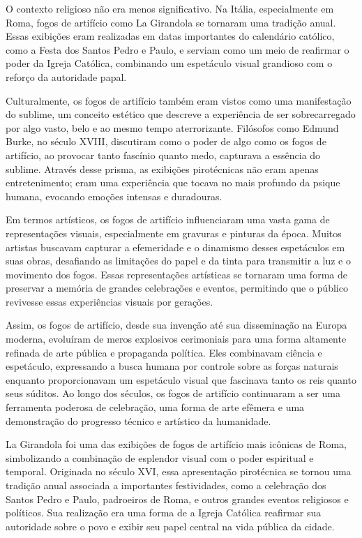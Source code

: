 O contexto religioso não era menos significativo. Na Itália, especialmente em Roma, fogos de artifício como La Girandola se tornaram uma tradição anual. Essas exibições eram realizadas em datas importantes do calendário católico, como a Festa dos Santos Pedro e Paulo, e serviam como um meio de reafirmar o poder da Igreja Católica, combinando um
espetáculo visual grandioso com o reforço da autoridade papal.

Culturalmente, os fogos de artifício também eram vistos como uma manifestação do sublime, um conceito estético que descreve a experiência de ser sobrecarregado por algo vasto, belo e ao mesmo tempo aterrorizante. Filósofos como Edmund Burke, no século XVIII, discutiram como o poder de algo como os fogos de artifício, ao provocar tanto fascínio quanto medo, capturava a essência do sublime. Através desse prisma, as exibições pirotécnicas não eram apenas entretenimento; eram uma experiência que tocava no mais profundo da psique humana, evocando emoções intensas e duradouras.

Em termos artísticos, os fogos de artifício influenciaram uma vasta gama de representações visuais, especialmente em gravuras e pinturas da época. Muitos artistas buscavam capturar a efemeridade e o dinamismo desses espetáculos em suas obras, desafiando as limitações do papel e da tinta para transmitir a luz e o movimento dos fogos. Essas representações artísticas se tornaram uma forma de preservar a memória de grandes celebrações e eventos, permitindo que o público revivesse essas experiências visuais por gerações.

Assim, os fogos de artifício, desde sua invenção até sua disseminação na Europa moderna, evoluíram de meros explosivos cerimoniais para uma forma altamente refinada de arte pública e propaganda política. Eles combinavam ciência e espetáculo, expressando a busca humana por controle sobre as forças naturais enquanto proporcionavam um espetáculo visual que fascinava tanto os reis quanto seus súditos. Ao longo dos séculos, os fogos de artifício continuaram a ser uma ferramenta poderosa de celebração, uma forma de arte efêmera e uma demonstração do progresso técnico e artístico da humanidade.

La Girandola foi uma das exibições de fogos de artifício mais icônicas de Roma, simbolizando a combinação de esplendor visual com o poder espiritual e temporal. Originada no século XVI, essa apresentação pirotécnica se tornou uma tradição anual associada a importantes festividades, como a celebração dos Santos Pedro e Paulo, padroeiros de Roma, e outros grandes eventos religiosos e políticos. Sua realização era uma forma de a Igreja Católica reafirmar sua autoridade sobre o povo e exibir seu papel central na vida pública da cidade.

